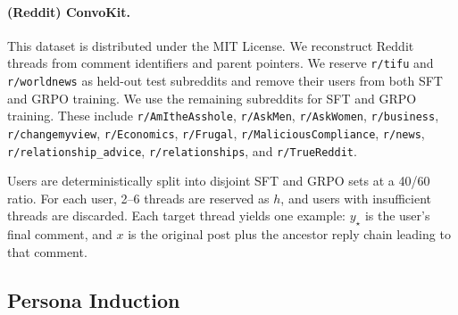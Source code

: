 \documentclass{article} %
\begin{document}
\paragraph{(Reddit) ConvoKit.}
This dataset is distributed under the MIT License. We reconstruct Reddit threads from comment identifiers and parent pointers.
We reserve \texttt{r/tifu} and \texttt{r/worldnews} as held-out test subreddits and remove their users from both SFT and GRPO training.
We use the remaining subreddits for SFT and GRPO training. These include \texttt{r/AmItheAsshole}, \texttt{r/AskMen}, \texttt{r/AskWomen}, \texttt{r/business}, \texttt{r/changemyview}, \texttt{r/Economics}, \texttt{r/Frugal}, \texttt{r/MaliciousCompliance}, \texttt{r/news}, \texttt{r/relationship\_advice}, \texttt{r/relationships}, and \texttt{r/TrueReddit}.

Users are deterministically split into disjoint SFT and GRPO sets at a 40/60 ratio.
For each user, 2--6 threads are reserved as $h$, and users with insufficient threads are discarded. Each target thread yields one example: $y_{\star}$ is the user's final comment, and $x$ is the original post plus the ancestor reply chain leading to that comment.






\subsection{Persona Induction}
\end{document}

